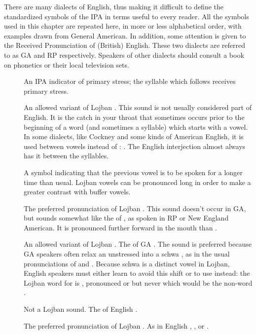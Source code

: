 There are many dialects of English, thus making it difficult to define the standardized symbols of the IPA in terms useful to every reader. All the symbols used in this chapter are repeated here, in more or less alphabetical order, with examples drawn from General American. In addition, some attention is given to the Received Pronunciation of (British) English. These two dialects are referred to as GA and RP respectively. Speakers of other dialects should consult a book on phonetics or their local television sets.
\begin{description}
\item[] An IPA indicator of primary stress; the syllable which follows  receives primary stress.
\item[] An allowed variant of Lojban . This sound is not usually considered part of English. It is the catch in your throat that sometimes occurs prior to the beginning of a word (and sometimes a syllable) which starts with a vowel. In some dialects, like Cockney and some kinds of American English, it is used between vowels instead of :  . The English interjection  almost always has it between the syllables.
\item[] A symbol indicating that the previous vowel is to be spoken for a longer time than usual. Lojban vowels can be pronounced long in order to make a greater contrast with buffer vowels.
\item[] The preferred pronunciation of Lojban . This sound doesn't occur in GA, but sounds somewhat like the  of , as spoken in RP or New England American. It is pronounced further forward in the mouth than .
\item[] An allowed variant of Lojban . The  of GA . The sound  is preferred because GA speakers often relax an unstressed  into a schwa , as in the usual pronunciations of  and . Because schwa is a distinct vowel in Lojban, English speakers must either learn to avoid this shift or to use  instead: the Lojban word for  is , pronounced  or  but never  which would be the non-word .
\item[] Not a Lojban sound. The  of English .
\item[] The preferred pronunciation of Lojban . As in English , , or .

\end{description}
